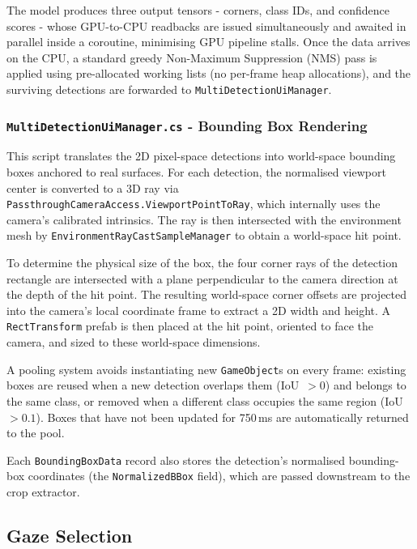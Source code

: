 \documentclass{article}
\begin{document}
The model produces three output tensors - corners, class IDs, and confidence scores - whose GPU-to-CPU readbacks are issued simultaneously and awaited in parallel inside a coroutine, minimising GPU pipeline stalls. Once the data arrives on the CPU, a standard greedy Non-Maximum Suppression (NMS) pass is applied using pre-allocated working lists (no per-frame heap allocations), and the surviving detections are forwarded to \texttt{MultiDetectionUiManager}.

\subsubsection{\texttt{MultiDetectionUiManager.cs} - Bounding Box Rendering}

This script translates the 2D pixel-space detections into world-space bounding boxes anchored to real surfaces. For each detection, the normalised viewport center is converted to a 3D ray via \texttt{PassthroughCameraAccess.ViewportPointToRay}, which internally uses the camera's calibrated intrinsics. The ray is then intersected with the environment mesh by \texttt{EnvironmentRayCastSampleManager} to obtain a world-space hit point.

To determine the physical size of the box, the four corner rays of the detection rectangle are intersected with a plane perpendicular to the camera direction at the depth of the hit point. The resulting world-space corner offsets are projected into the camera's local coordinate frame to extract a 2D width and height. A \texttt{RectTransform} prefab is then placed at the hit point, oriented to face the camera, and sized to these world-space dimensions.

A pooling system avoids instantiating new \texttt{GameObject}s on every frame: existing boxes are reused when a new detection overlaps them (IoU~$> 0$) and belongs to the same class, or removed when a different class occupies the same region (IoU~$> 0.1$). Boxes that have not been updated for 750\,ms are automatically returned to the pool.

Each \texttt{BoundingBoxData} record also stores the detection's normalised bounding-box coordinates (the \texttt{NormalizedBBox} field), which are passed downstream to the crop extractor.

\subsection{Gaze Selection}
\end{document}
